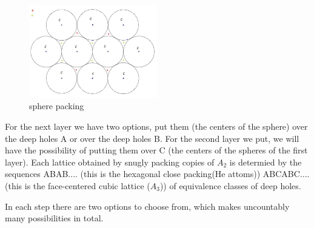 \begin{figure}[htbp]
\centering
\includegraphics[width=0.5\textwidth]{apunteslattice}
\caption{sphere packing}
\end{figure}

For the next layer we have two options, put them (the centers of the sphere) over the deep holes A or over the deep holes B. For the second layer we put, we will have the possibility of putting them over C (the centers of the spheres of the first layer).
Each lattice obtained by snugly packing copies of $A_2$ is determied by the sequences
ABAB.... (this is the hexagonal close packing(He attoms))
ABCABC....(this is the face-centered cubic lattice ($A_3$))
of equivalence classes of deep holes.

In each step there are two options to choose from, which makes uncountably many possibilities in total.



